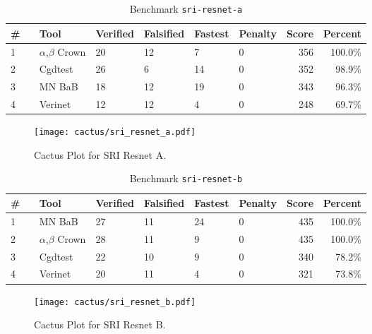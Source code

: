 \begin{table}[h]
\begin{center}
\caption{Benchmark \texttt{sri-resnet-a}} \label{tab:cat_{cat}}
{\setlength{\tabcolsep}{2pt}
\begin{tabular}[h]{@{}llllllrr@{}}
\toprule
\textbf{\# ~} & \textbf{Tool} & \textbf{Verified} & \textbf{Falsified} & \textbf{Fastest} & \textbf{Penalty} & \textbf{Score} & \textbf{Percent}\\
\midrule
1 & $\alpha$,$\beta$ Crown & 20 & 12 & 7 & 0 & 356 & 100.0\% \\
2 & Cgdtest & 26 & 6 & 14 & 0 & 352 & 98.9\% \\
3 & MN BaB & 18 & 12 & 19 & 0 & 343 & 96.3\% \\
4 & Verinet & 12 & 12 & 4 & 0 & 248 & 69.7\% \\
\bottomrule
\end{tabular}
}
\end{center}
\end{table}



\begin{figure}[h]
\centerline{\texttt{[image: cactus/sri\_resnet\_a.pdf]}}
\caption{Cactus Plot for SRI Resnet A.}
\label{fig:quantPic}
\end{figure}



\begin{table}[h]
\begin{center}
\caption{Benchmark \texttt{sri-resnet-b}} \label{tab:cat_{cat}}
{\setlength{\tabcolsep}{2pt}
\begin{tabular}[h]{@{}llllllrr@{}}
\toprule
\textbf{\# ~} & \textbf{Tool} & \textbf{Verified} & \textbf{Falsified} & \textbf{Fastest} & \textbf{Penalty} & \textbf{Score} & \textbf{Percent}\\
\midrule
1 & MN BaB & 27 & 11 & 24 & 0 & 435 & 100.0\% \\
2 & $\alpha$,$\beta$ Crown & 28 & 11 & 9 & 0 & 435 & 100.0\% \\
3 & Cgdtest & 22 & 10 & 9 & 0 & 340 & 78.2\% \\
4 & Verinet & 20 & 11 & 4 & 0 & 321 & 73.8\% \\
\bottomrule
\end{tabular}
}
\end{center}
\end{table}



\begin{figure}[h]
\centerline{\texttt{[image: cactus/sri\_resnet\_b.pdf]}}
\caption{Cactus Plot for SRI Resnet B.}
\label{fig:quantPic}
\end{figure}


